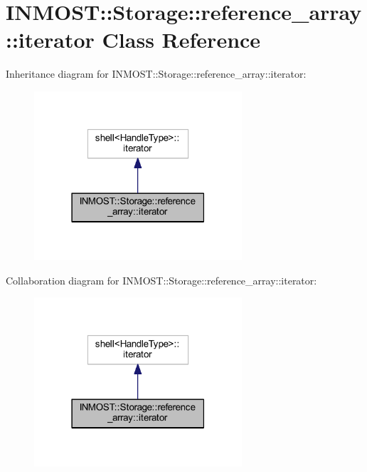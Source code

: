 \hypertarget{classINMOST_1_1Storage_1_1reference__array_1_1iterator}{\section{I\-N\-M\-O\-S\-T\-:\-:Storage\-:\-:reference\-\_\-array\-:\-:iterator Class Reference}
\label{classINMOST_1_1Storage_1_1reference__array_1_1iterator}
}


Inheritance diagram for I\-N\-M\-O\-S\-T\-:\-:Storage\-:\-:reference\-\_\-array\-:\-:iterator\-:\nopagebreak
\begin{figure}[H]
\begin{center}
\leavevmode
\includegraphics[width=219pt]{classINMOST_1_1Storage_1_1reference__array_1_1iterator__inherit__graph}
\end{center}
\end{figure}


Collaboration diagram for I\-N\-M\-O\-S\-T\-:\-:Storage\-:\-:reference\-\_\-array\-:\-:iterator\-:\nopagebreak
\begin{figure}[H]
\begin{center}
\leavevmode
\includegraphics[width=219pt]{classINMOST_1_1Storage_1_1reference__array_1_1iterator__coll__graph}
\end{center}
\end{figure}
